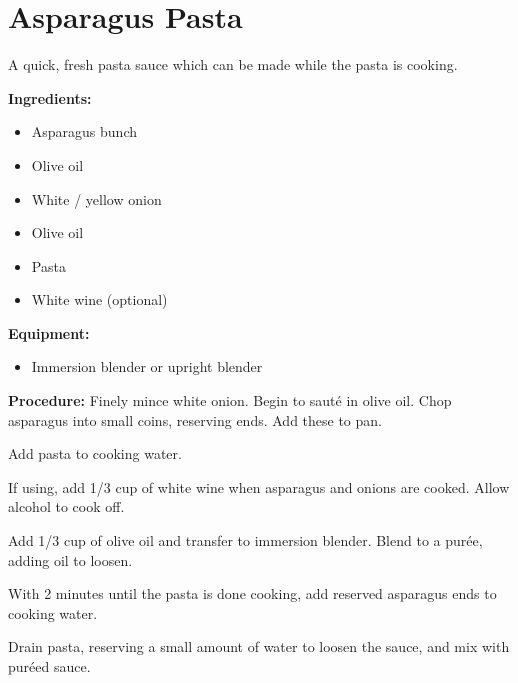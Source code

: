 \section{Asparagus Pasta} %
A quick, fresh pasta sauce which can be made while the pasta is cooking.

\begin{multicols}{2}\raggedcolumns
\textbf{Ingredients:}

\begin{itemize}
	\item Asparagus bunch
	\item Olive oil
	\item White / yellow onion
	\item Olive oil
	\item Pasta
	\item White wine (optional)
\end{itemize}


\textbf{Equipment:}
	\begin{itemize}
		\item Immersion blender or upright blender
	\end{itemize}

\columnbreak

\textbf{Procedure:}
Finely mince white onion. Begin to sauté in olive oil.
Chop asparagus into small coins, reserving ends. Add these to pan.

Add pasta to cooking water.

If using, add 1/3 cup of white wine when asparagus and onions are cooked. Allow alcohol to cook off.

Add 1/3 cup of olive oil and transfer to immersion blender. Blend to a purée, adding oil to loosen.

With 2 minutes until the pasta is done cooking, add reserved asparagus ends to cooking water.

Drain pasta, reserving a small amount of water to loosen the sauce, and mix with puréed sauce.

\end{multicols}
